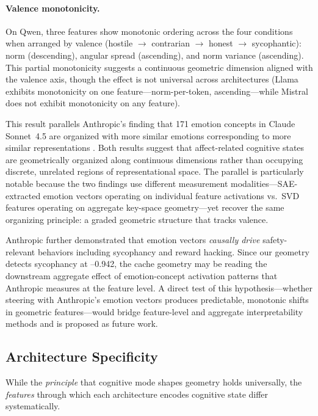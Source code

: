 \paragraph{Valence monotonicity.}
On Qwen, three features show monotonic ordering across the four conditions when arranged by valence (hostile $\to$ contrarian $\to$ honest $\to$ sycophantic): norm (descending), angular spread (ascending), and norm variance (ascending).
This partial monotonicity suggests a continuous geometric dimension aligned with the valence axis, though the effect is not universal across architectures (Llama exhibits monotonicity on one feature---norm-per-token, ascending---while Mistral does not exhibit monotonicity on any feature).

This result parallels Anthropic's finding that 171 emotion concepts in Claude Sonnet~4.5 are organized with more similar emotions corresponding to more similar representations \cite{anthropic_emotions2026}.
Both results suggest that affect-related cognitive states are geometrically organized along continuous dimensions rather than occupying discrete, unrelated regions of representational space.
The parallel is particularly notable because the two findings use different measurement modalities---SAE-extracted emotion vectors operating on individual feature activations vs.\ \kvcache SVD features operating on aggregate key-space geometry---yet recover the same organizing principle: a graded geometric structure that tracks valence.

Anthropic further demonstrated that emotion vectors \emph{causally drive} safety-relevant behaviors including sycophancy and reward hacking.
Since our \kvcache geometry detects sycophancy at --0.942, the cache geometry may be reading the downstream aggregate effect of emotion-concept activation patterns that Anthropic measures at the feature level.
A direct test of this hypothesis---whether steering with Anthropic's emotion vectors produces predictable, monotonic shifts in \kvcache geometric features---would bridge feature-level and aggregate interpretability methods and is proposed as future work.

\subsection{Architecture Specificity}
\label{sec:architecture_specificity}

While the \emph{principle} that cognitive mode shapes \kvcache geometry holds universally, the \emph{features} through which each architecture encodes cognitive state differ systematically.

